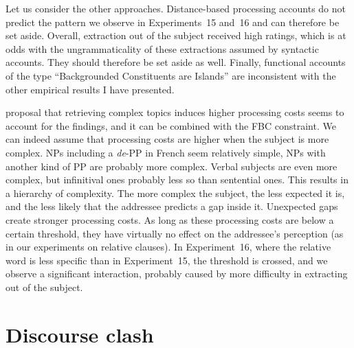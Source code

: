 Let us consider the other approaches. Distance-based processing accounts do not predict the pattern we observe in Experiments~15 and~16 and can therefore be set aside. Overall, extraction out of the subject received high ratings, which is at odds with the ungrammaticality of these extractions assumed by syntactic accounts. They should therefore be set aside as well. Finally, functional accounts of the type ``Backgrounded Constituents are Islands'' are inconsistent with the other empirical results I have presented.

 proposal that retrieving complex topics induces higher processing costs seems to account for the findings, and it can be combined with the FBC constraint. We can indeed assume that processing costs are higher when the subject is more complex. NPs including a \emph{de}-PP in French seem relatively simple, NPs with another kind of PP are probably more complex. Verbal subjects are even more complex, but infinitival ones probably less so than sentential ones. This results in a hierarchy of complexity. The more complex the subject, the less expected it is, and the less likely that the addressee predicts a gap inside it. Unexpected gaps create stronger processing costs. As long as these processing costs are below a certain threshold, they have virtually no effect on the addressee's perception (as in our experiments on relative clauses). In Experiment~16, where the relative word is less specific than in Experiment~15, the threshold is crossed, and we observe a significant interaction, probably caused by more difficulty in extracting out of the subject.

\section{Discourse clash}

